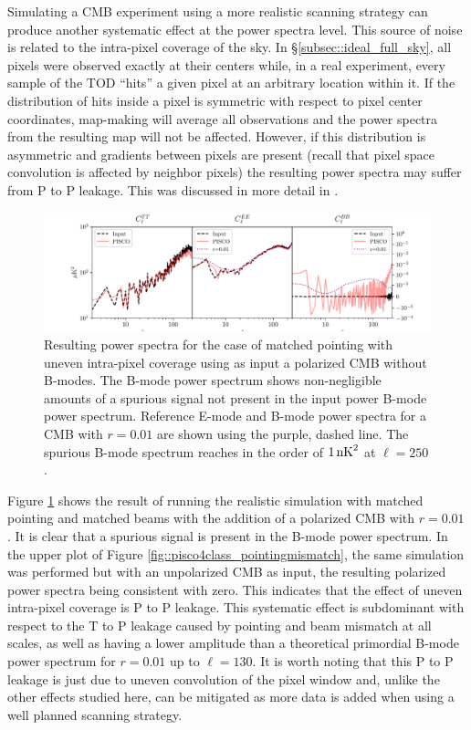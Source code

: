 \documentclass[a4paper,11pt]{article}
\begin{document}
Simulating a CMB experiment using a more realistic scanning strategy can produce another systematic effect at the power spectra level. This source of noise is related to the intra-pixel coverage of the sky. In \S\ref{subsec::ideal_full_sky}, all pixels were observed exactly at their centers while, in a real experiment, every sample of the TOD ``hits'' a given pixel at an arbitrary location within it. If the distribution of hits inside a pixel is symmetric with respect to pixel center coordinates, map-making will average all observations and the power spectra from the resulting map will not be affected. However, if this distribution is asymmetric and gradients between pixels are present (recall that pixel space convolution is affected by neighbor pixels) the resulting power spectra may suffer from P to P leakage. This was discussed in more detail in \cite{2005poutanen}. 

\begin{figure}
	\centering
	\includegraphics[width=1\textwidth]{figures/intrapixel.pdf}
	\caption{Resulting power spectra for the case of matched pointing with uneven intra-pixel coverage using as input a polarized CMB without B-modes. The B-mode power spectrum shows non-negligible amounts of a spurious signal not present in the input power B-mode power spectrum. Reference E-mode and B-mode power spectra for a CMB with $r=0.01$ are shown using the purple, dashed line. The spurious B-mode spectrum reaches in the order of $1\, \rm{nK}^2$ at $\ell = 250$.}
	\label{fig::pisco4class_intrapixel}
\end{figure}

Figure \ref{fig::pisco4class_intrapixel} shows the result of running the realistic simulation with matched pointing and matched beams with the addition of a polarized CMB with $r=0.01$. It is clear that a spurious signal is present in the B-mode power spectrum. In the upper plot of Figure \ref{fig::pisco4class_pointingmismatch}, the same simulation was performed but with an unpolarized CMB as input, the resulting polarized power spectra being consistent with zero. This indicates that the effect of uneven intra-pixel coverage is P to P leakage. This systematic effect is subdominant with respect to the T to P leakage caused by pointing and beam mismatch at all scales, as well as having a lower amplitude than a theoretical primordial B-mode power spectrum for $r=0.01$ up to $\ell=130$. It is worth noting that this P to P leakage is just due to uneven convolution of the pixel window and, unlike the other effects studied here, can be mitigated as more data is added when using a well planned scanning strategy.
\end{document}
